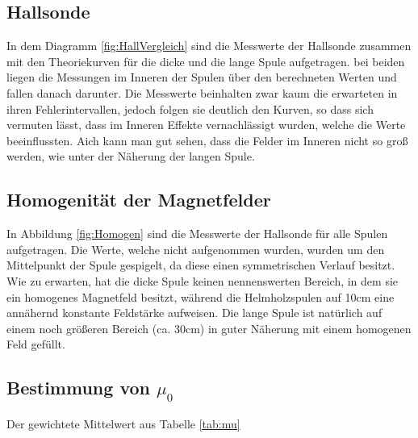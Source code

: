 \documentclass[12pt,a4paper,titlepage,headinclude,bibtotoc]{scrartcl}
\begin{document}
\subsection{Hallsonde}
In dem Diagramm \ref{fig:HallVergleich} sind die Messwerte der Hallsonde zusammen mit den Theoriekurven für die dicke und die lange Spule aufgetragen.
bei beiden liegen die Messungen im Inneren der Spulen über den berechneten Werten und fallen danach darunter.
Die Messwerte beinhalten zwar kaum die erwarteten in ihren Fehlerintervallen, jedoch folgen sie deutlich den Kurven, so dass sich vermuten lässt, dass im Inneren Effekte vernachlässigt wurden, welche die Werte beeinflussten.
Aich kann man gut sehen, dass die Felder im Inneren nicht so groß werden, wie unter der Näherung der langen Spule.


\subsection{Homogenität der Magnetfelder}
In Abbildung \ref{fig:Homogen} sind die Messwerte der Hallsonde für alle Spulen aufgetragen.
Die Werte, welche nicht aufgenommen wurden, wurden um den Mittelpunkt der Spule gespigelt, da diese einen symmetrischen Verlauf besitzt.
Wie zu erwarten, hat die dicke Spule keinen nennenswerten Bereich, in dem sie ein homogenes Magnetfeld besitzt, während die Helmholzspulen auf 10cm eine annähernd konstante Feldstärke aufweisen.
Die lange Spule ist natürlich auf einem noch größeren Bereich (ca. 30cm) in guter Näherung mit einem homogenen Feld gefüllt.


\subsection{Bestimmung von $\mu_0$}
Der gewichtete Mittelwert aus Tabelle \ref{tab:mu}



\end{document}

